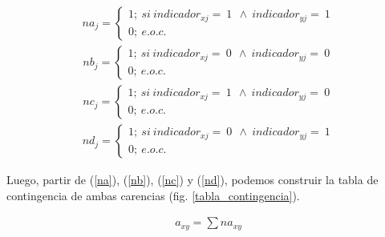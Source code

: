 \documentclass[12pt,letterpaper,spanish]{article}
\begin{document}
\begin{enumerate}
\begin{equation} \label{n11}
\begin{split}
na_{j}= \begin{cases}
        1;\:si\:indicador_{xj}=\:1\:\ \wedge \:indicador_{yj}=\:1\\
        0;\:e.o.c.
        \end{cases}
\end{split}
\end{equation}
\begin{equation} \label{n00}
\begin{split}
nb_{j}= \begin{cases}
        1;\:si\:indicador_{xj}=\:0\:\ \wedge \:indicador_{yj}=\:0\\
        0;\:e.o.c.
        \end{cases}
\end{split}
\end{equation}
\begin{equation} \label{n10}
\begin{split}
nc_{j}= \begin{cases}
        1;\:si\:indicador_{xj}=\:1\:\ \wedge \:indicador_{yj}=\:0\\
        0;\:e.o.c.
        \end{cases}
\end{split}
\end{equation}
\begin{equation} \label{n01}
\begin{split}
nd_{j}= \begin{cases}
        1;\:si\:indicador_{xj}=\:0\:\ \wedge \:indicador_{yj}=\:1\\
        0;\:e.o.c.
        \end{cases}
\end{split}
\end{equation}


Luego, partir de (\ref{na}), (\ref{nb}), (\ref{nc}) y (\ref{nd}), podemos construir la tabla de contingencia de ambas carencias (fig. \ref{tabla_contingencia}).

\begin{equation} \label{na}
\begin{split}
a_{xy}=\sum na_{xy}
\end{split}
\end{equation}


\end{enumerate}
\end{document}
